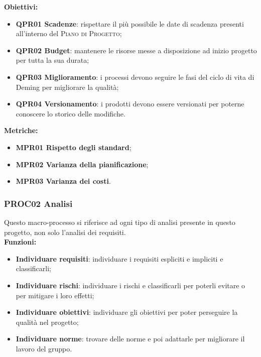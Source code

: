 \documentclass[../piano_di_qualifica.tex]{subfiles}
\begin{document}
\textbf{Obiettivi:}
\smallbreak
\begin{itemize}
	\item \textbf{QPR01 Scadenze}: rispettare il più possibile le date di scadenza presenti all'interno del \textsc{Piano di Progetto};
	\item \textbf{QPR02 Budget}: mantenere le risorse messe a disposizione ad inizio progetto per tutta la sua durata;
	\item \textbf{QPR03 Miglioramento}: i processi devono seguire le fasi del ciclo di vita di Deming per migliorare la qualità;
	\item \textbf{QPR04 Versionamento}: i prodotti devono essere versionati per poterne conoscere lo storico delle modifiche.
\end{itemize}

\textbf{Metriche:}
\smallbreak
\begin{itemize}
	\item \textbf{MPR01 Rispetto degli standard};
	\item \textbf{MPR02 Varianza della pianificazione};
	\item \textbf{MPR03 Varianza dei costi}.
\end{itemize}

\subsubsection{PROC02 Analisi}
Questo macro-processo si riferisce ad ogni tipo di analisi presente in questo progetto, non solo l'analisi dei requisiti.\\

\textbf{Funzioni:}
\smallbreak
\begin{itemize}
	\item \textbf{Individuare requisiti}: individuare i requisiti espliciti e impliciti e classificarli;
	\item \textbf{Individuare rischi}: individuare i rischi e classificarli per poterli evitare o per mitigare i loro effetti;
	\item \textbf{Individuare obiettivi}: individuare gli obiettivi per poter perseguire la qualità nel progetto;
	\item \textbf{Individuare norme}: trovare delle norme e poi adattarle per migliorare il lavoro del gruppo.
\end{itemize}
\end{document}
